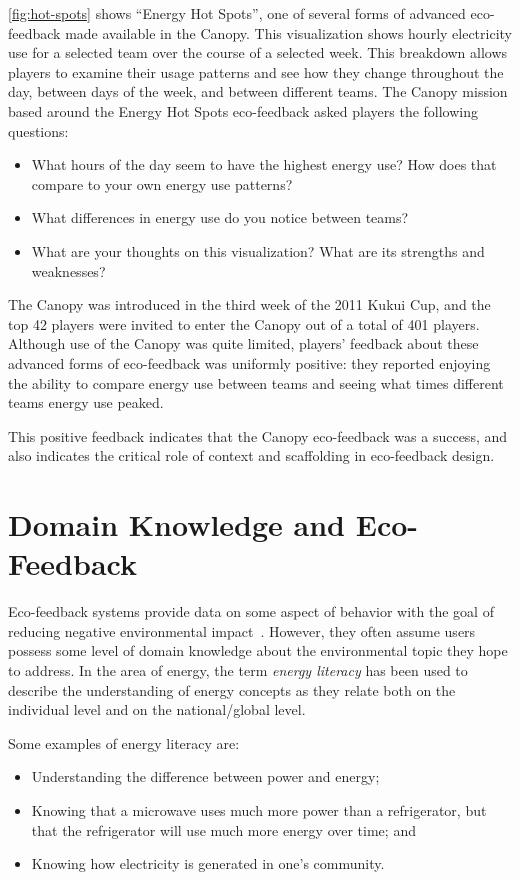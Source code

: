 \documentclass{sigchi}
\begin{document}
\autoref{fig:hot-spots} shows ``Energy Hot Spots'', one of several forms of advanced eco-feedback made available in the Canopy. This visualization shows hourly electricity use for a selected team over the course of a selected week. This breakdown allows players to examine their usage patterns and see how they change throughout the day, between days of the week, and between different teams. The Canopy mission based around the Energy Hot Spots eco-feedback asked players the following questions:

\begin{itemize}
	\item What hours of the day seem to have the highest energy use? How does that compare to your own energy use patterns?
	\item What differences in energy use do you notice between teams?
	\item What are your thoughts on this visualization? What are its strengths and weaknesses?
\end{itemize}

The Canopy was introduced in the third week of the 2011 Kukui Cup, and the top 42 players were invited to enter the Canopy out of a total of 401 players. Although use of the Canopy was quite limited, players' feedback about these advanced forms of eco-feedback was uniformly positive: they reported enjoying the ability to compare energy use between teams and seeing what times different teams energy use peaked. 

This positive feedback indicates that the Canopy eco-feedback was a success, and also indicates the critical role of context and scaffolding in eco-feedback design. 


\section{Domain Knowledge and Eco-Feedback}

Eco-feedback systems provide data on some aspect of behavior with the goal of reducing negative environmental impact~\cite{Froehlich2010}. However, they often assume users possess some level of domain knowledge about the environmental topic they hope to address. In the area of energy, the term \emph{energy literacy} has been used to describe the understanding of energy concepts as they relate both on the individual level and on the national/global level.

Some examples of energy literacy are:

\begin{itemize}
	\item Understanding the difference between power and energy;
	\item Knowing that a microwave uses much more power than a refrigerator, but that the refrigerator will use much more energy over time; and
	\item Knowing how electricity is generated in one's community.
\end{itemize}
\end{document}

